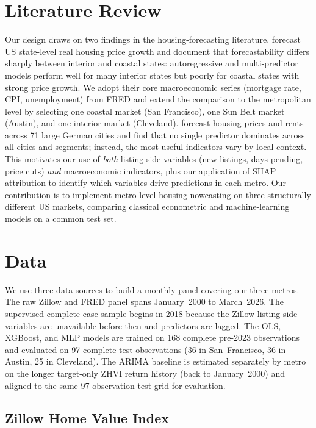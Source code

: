 \documentclass[12pt]{article}
\begin{document}
\section{Literature Review}
\label{sec:lit}

Our design draws on two findings in the housing-forecasting literature. \citet{rapach2009forecasting} forecast US state-level real housing price growth and document that forecastability differs sharply between interior and coastal states: autoregressive and multi-predictor models perform well for many interior states but poorly for coastal states with strong price growth. We adopt their core macroeconomic series (mortgage rate, CPI, unemployment) from FRED and extend the comparison to the metropolitan level by selecting one coastal market (San Francisco), one Sun Belt market (Austin), and one interior market (Cleveland). \citet{kholodilin2014business} forecast housing prices and rents across 71 large German cities and find that no single predictor dominates across all cities and segments; instead, the most useful indicators vary by local context. This motivates our use of \emph{both} listing-side variables (new listings, days-pending, price cuts) \emph{and} macroeconomic indicators, plus our application of SHAP attribution to identify which variables drive predictions in each metro. Our contribution is to implement metro-level housing nowcasting on three structurally different US markets, comparing classical econometric and machine-learning models on a common test set.

\section{Data}
\label{sec:data}

We use three data sources to build a monthly panel covering our three metros. The raw Zillow and FRED panel spans January~2000 to March~2026. The supervised complete-case sample begins in 2018 because the Zillow listing-side variables are unavailable before then and predictors are lagged. The OLS, XGBoost, and MLP models are trained on 168 complete pre-2023 observations and evaluated on 97 complete test observations (36 in San~Francisco, 36 in Austin, 25 in Cleveland). The ARIMA baseline is estimated separately by metro on the longer target-only ZHVI return history (back to January~2000) and aligned to the same 97-observation test grid for evaluation.

\subsection{Zillow Home Value Index}
\end{document}
